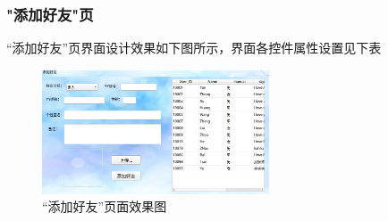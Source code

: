 \documentclass{progartcn}
\begin{document}
\subsubsection{"添加好友"页}

“添加好友”页界面设计效果如下图所示，界面各控件属性设置见下表

\begin{figure}[H]
	\centering
	\includegraphics[width=0.6\textwidth]{6.png}
	\caption{\centering  “添加好友”页面效果图}
\end{figure}
\end{document}
